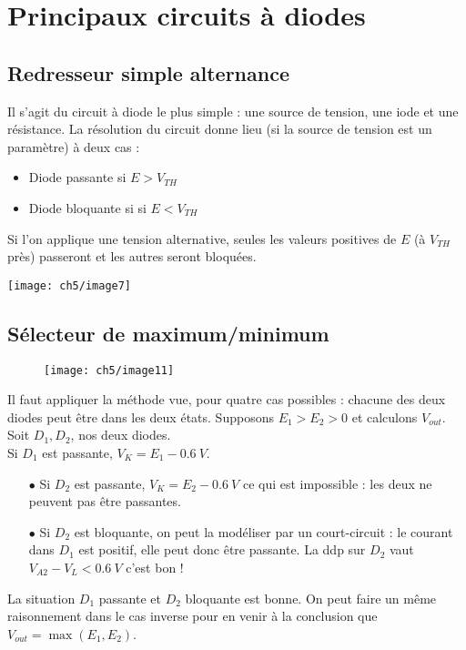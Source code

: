 		\newpage
		
	\section{Principaux circuits à diodes}
		\subsection{Redresseur simple alternance}
		Il s'agit du circuit à diode le plus simple : une source de tension, une iode 
		et une résistance. La résolution du circuit donne lieu (si la source de tension 
		est un paramètre) à deux cas :
		\begin{itemize}
		\item Diode passante si $E > V_{TH}$
		\item Diode bloquante si si $E < V_{TH}$
		\end{itemize}
		Si l'on applique une tension alternative, seules les valeurs positives de $E$ 
		(à $V_{TH}$ près) passeront et les autres seront bloquées.
		\begin{center}
		\texttt{[image: ch5/image7]}
		\end{center}
		
		\subsection{Sélecteur de maximum/minimum}
		\begin{wrapfigure}[8]{r}{3cm}
		\vspace{-0.5cm}
		\texttt{[image: ch5/image11]}
		\end{wrapfigure}
		Il faut appliquer la méthode vue, pour quatre cas possibles : chacune des 
		deux diodes peut être dans les deux états. Supposons $E_1>E_2>0$ et 
		calculons $V_{out}$. Soit $D_1, D_2$, nos deux diodes.\\
		Si $D_1$ est passante, $V_K = E_1-0.6\ V$.
		\begin{itemize}
		\item[$\bullet$] Si $D_2$ est passante, $V_K = E_2-0.6\ V$ ce qui est 
		impossible : les deux ne peuvent pas être passantes.
		\item[$\bullet$] Si $D_2$ est bloquante, on peut la modéliser par un 
		court-circuit : le courant dans $D_1$ est positif, elle peut donc être 
		passante. La ddp sur $D_2$ vaut $V_{A2}-V_L < 0.6\ V$ c'est bon !
		\end{itemize}
		La situation $D_1$ passante et $D_2$ bloquante est bonne. On peut faire 
		un même raisonnement dans le cas inverse pour en venir à la conclusion 
		que $V_{out} = \max(E_1,E_2)$.
		

